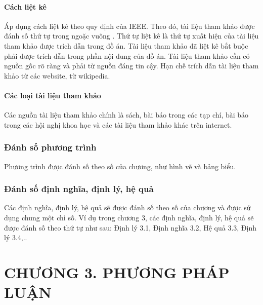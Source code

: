 \documentclass{thesis}
\begin{document}
\paragraph{Cách liệt kê}\mbox{}

Áp dụng cách liệt kê theo quy định của IEEE. Theo đó, tài liệu tham khảo được đánh số thứ tự trong ngoặc vuông \cite{6975204}. Thứ tự liệt kê là thứ tự xuất hiện của tài liệu tham khảo được trích dẫn trong đồ án. Tài liệu tham khảo đã liệt kê bắt buộc phải được trích dẫn trong phần nội dung của đồ án. Tài liệu tham khảo cần có nguồn gốc rõ ràng và phải từ nguồn đáng tin cậy. Hạn chế trích dẫn tài liệu tham khảo từ các website, từ wikipedia.

\paragraph{Các loại tài liệu tham khảo}\mbox{}

Các nguồn tài liệu tham khảo chính là sách, bài báo trong các tạp chí, bài báo trong các hội nghị khoa học và các tài liệu tham khảo khác trên internet.

\subsubsection{Đánh số phương trình}
Phương trình được đánh số theo số của chương, như hình vẽ và bảng biểu.

\subsubsection{Đánh số định nghĩa, định lý, hệ quả}
Các định nghĩa, định lý, hệ quả sẽ được đánh số theo số của chương và được sử dụng chung một chỉ số. Ví dụ trong chương 3, các định nghĩa, định lý, hệ quả sẽ được đánh số theo thứ tự như sau: Định lý 3.1, Định nghĩa 3.2, Hệ quả 3.3, Định lý 3.4,..

\newpage

\section*{CHƯƠNG 3. PHƯƠNG PHÁP LUẬN}
    
\setcounter{section}{3}
    \setcounter{subsection}{0}
        \setcounter{figure}{0}
            \setcounter{table}{0}
\end{document}
